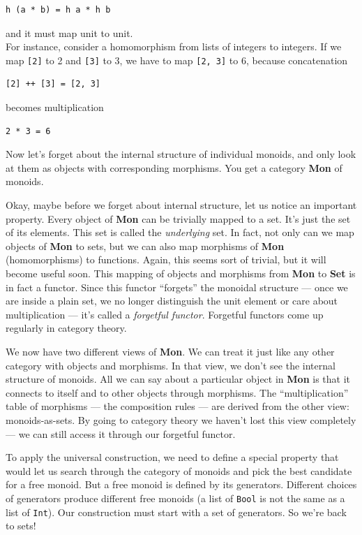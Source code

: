 \begin{verbatim}
h (a * b) = h a * h b
\end{verbatim}

and it must map unit to unit.\\
For instance, consider a homomorphism from lists of integers to
integers. If we map \texttt{{[}2{]}} to 2 and \texttt{{[}3{]}} to 3, we
have to map \texttt{{[}2,\ 3{]}} to 6, because concatenation

\begin{verbatim}
[2] ++ [3] = [2, 3]
\end{verbatim}

becomes multiplication

\begin{verbatim}
2 * 3 = 6
\end{verbatim}

Now let's forget about the internal structure of individual monoids, and
only look at them as objects with corresponding morphisms. You get a
category \textbf{Mon} of monoids.

Okay, maybe before we forget about internal structure, let us notice an
important property. Every object of \textbf{Mon} can be trivially mapped
to a set. It's just the set of its elements. This set is called the
\emph{underlying} set. In fact, not only can we map objects of
\textbf{Mon} to sets, but we can also map morphisms of \textbf{Mon}
(homomorphisms) to functions. Again, this seems sort of trivial, but it
will become useful soon. This mapping of objects and morphisms from
\textbf{Mon} to \textbf{Set} is in fact a functor. Since this functor
``forgets'' the monoidal structure --- once we are inside a plain set,
we no longer distinguish the unit element or care about multiplication
--- it's called a \emph{forgetful functor}. Forgetful functors come up
regularly in category theory.

We now have two different views of \textbf{Mon}. We can treat it just
like any other category with objects and morphisms. In that view, we
don't see the internal structure of monoids. All we can say about a
particular object in \textbf{Mon} is that it connects to itself and to
other objects through morphisms. The ``multiplication'' table of
morphisms --- the composition rules --- are derived from the other view:
monoids-as-sets. By going to category theory we haven't lost this view
completely --- we can still access it through our forgetful functor.

To apply the universal construction, we need to define a special
property that would let us search through the category of monoids and
pick the best candidate for a free monoid. But a free monoid is defined
by its generators. Different choices of generators produce different
free monoids (a list of \texttt{Bool} is not the same as a list of
\texttt{Int}). Our construction must start with a set of generators. So
we're back to sets!

